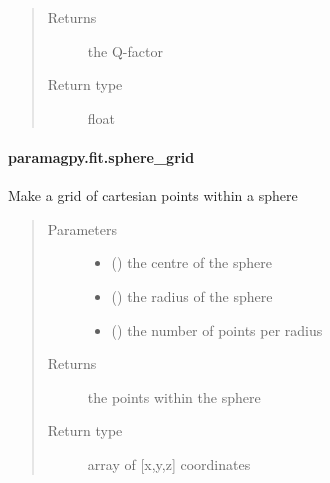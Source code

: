 \documentclass[a4paper,10pt,english,openany,oneside]{sphinxmanual}
\begin{document}
\begin{fulllineitems}
\begin{quote}
\begin{description}
\begin{itemize}
\end{itemize}

\item[{Returns}] \leavevmode
{} \textendash{} the Q-factor

\item[{Return type}] \leavevmode
float

\end{description}\end{quote}

\end{fulllineitems}



\paragraph{paramagpy.fit.sphere\_grid}
\label{\detokenize{reference/generated/paramagpy.fit.sphere_grid:paramagpy-fit-sphere-grid}}\label{\detokenize{reference/generated/paramagpy.fit.sphere_grid::doc}}

\begin{fulllineitems}
\label{\detokenize{reference/generated/paramagpy.fit.sphere_grid:paramagpy.fit.sphere_grid}}
Make a grid of cartesian points within a sphere
\begin{quote}\begin{description}
\item[{Parameters}] \leavevmode\begin{itemize}
\item {} 
 () \textendash{} the centre of the sphere

\item {} 
 () \textendash{} the radius of the sphere

\item {} 
 () \textendash{} the number of points per radius

\end{itemize}

\item[{Returns}] \leavevmode
{} \textendash{} the points within the sphere

\item[{Return type}] \leavevmode
array of {[}x,y,z{]} coordinates

\end{description}\end{quote}

\end{fulllineitems}
\end{document}
